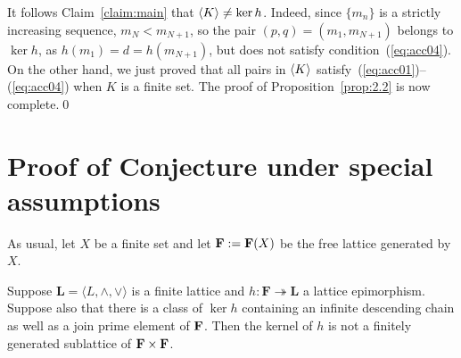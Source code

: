 It follows Claim~\ref{claim:main} that 
$\langle K\rangle \neq \ker h$. Indeed, since $\{m_n\}$ is a strictly increasing sequence, 
$m_N < m_{N+1}$, so the pair $(p, q) = (m_1, m_{N+1})$ belongs to $\ker h$, as 
$h(m_1) = d = h(m_{N+1})$, but does not satisfy condition~(\ref{eq:acc04}). On 
the other hand, we just proved that all pairs in $\langle K\rangle$ 
satisfy~(\ref{eq:acc01})--(\ref{eq:acc04}) when $K$ is a finite set.   The 
proof of Proposition~\ref{prop:2.2} is now complete.\qed


\bigskip


  \appendix

\section{Proof of Conjecture under special assumptions}\label{app:conjecture}
As usual, let $X$ be a finite set and let $\mathbf{F} := \mathbf{F} (X)$ be the free 
lattice generated by $X$.
\begin{proposition}\label{prop:conjecture}
Suppose $\mathbf L = \langle L, \wedge, \vee\rangle$ is a finite lattice and 
$h\colon \mathbf{F} \twoheadrightarrow \mathbf{L}$ a lattice epimorphism.
Suppose also that there is a class of $\ker h$ containing an infinite descending 
chain as well as a join prime element of $\mathbf{F}$. 
Then the kernel of $h$ is not a finitely generated sublattice 
of $\mathbf{F} \times \mathbf{F}$.
\end{proposition}

